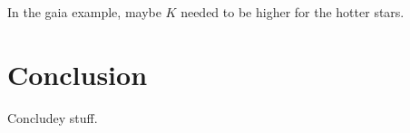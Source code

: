 \documentclass[onecolumn,floatfix]{aastex631}
\begin{document}
In the gaia example, maybe $K$ needed to be higher for the hotter stars.

\section{Conclusion} \label{sec:conclusion}

Concludey stuff.

\appendix








\end{document}
